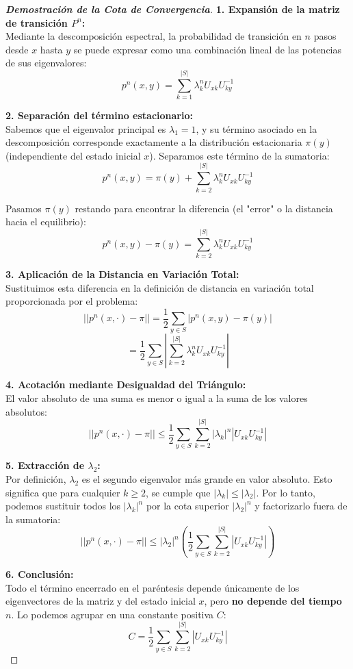 \documentclass[10pt,a4paper]{article}
\begin{document}
\begin{proof}[\textbf{Demostración de la Cota de Convergencia}]
    \textbf{1. Expansión de la matriz de transición $P^n$:} \\
    Mediante la descomposición espectral, la probabilidad de transición en $n$ pasos desde $x$ hasta $y$ se puede expresar como una combinación lineal de las potencias de sus eigenvalores:
    \[ p^n(x,y) = \sum_{k=1}^{|S|} \lambda_k^n U_{xk} U^{-1}_{ky} \]
    
    \textbf{2. Separación del término estacionario:} \\
    Sabemos que el eigenvalor principal es $\lambda_1 = 1$, y su término asociado en la descomposición corresponde exactamente a la distribución estacionaria $\pi(y)$ (independiente del estado inicial $x$). Separamos este término de la sumatoria:
    \[ p^n(x,y) = \pi(y) + \sum_{k=2}^{|S|} \lambda_k^n U_{xk} U^{-1}_{ky} \]
    
    Pasamos $\pi(y)$ restando para encontrar la diferencia (el "error" o la distancia hacia el equilibrio):
    \[ p^n(x,y) - \pi(y) = \sum_{k=2}^{|S|} \lambda_k^n U_{xk} U^{-1}_{ky} \]

    \textbf{3. Aplicación de la Distancia en Variación Total:} \\
    Sustituimos esta diferencia en la definición de distancia en variación total proporcionada por el problema:
    \[ ||p^n(x, \cdot) - \pi|| = \frac{1}{2} \sum_{y \in S} | p^n(x,y) - \pi(y) | \]
    \[ = \frac{1}{2} \sum_{y \in S} \left| \sum_{k=2}^{|S|} \lambda_k^n U_{xk} U^{-1}_{ky} \right| \]

    \textbf{4. Acotación mediante Desigualdad del Triángulo:} \\
    El valor absoluto de una suma es menor o igual a la suma de los valores absolutos:
    \[ ||p^n(x, \cdot) - \pi|| \le \frac{1}{2} \sum_{y \in S} \sum_{k=2}^{|S|} |\lambda_k|^n |U_{xk} U^{-1}_{ky}| \]

    \textbf{5. Extracción de $\lambda_2$:} \\
    Por definición, $\lambda_2$ es el segundo eigenvalor más grande en valor absoluto. Esto significa que para cualquier $k \ge 2$, se cumple que $|\lambda_k| \le |\lambda_2|$. Por lo tanto, podemos sustituir todos los $|\lambda_k|^n$ por la cota superior $|\lambda_2|^n$ y factorizarlo fuera de la sumatoria:
    \[ ||p^n(x, \cdot) - \pi|| \le |\lambda_2|^n \left( \frac{1}{2} \sum_{y \in S} \sum_{k=2}^{|S|} |U_{xk} U^{-1}_{ky}| \right) \]

    \textbf{6. Conclusión:} \\
    Todo el término encerrado en el paréntesis depende únicamente de los eigenvectores de la matriz y del estado inicial $x$, pero \textbf{no depende del tiempo $n$}. Lo podemos agrupar en una constante positiva $C$:
    \[ C = \frac{1}{2} \sum_{y \in S} \sum_{k=2}^{|S|} |U_{xk} U^{-1}_{ky}| \]
    

\end{proof}
\end{document}
